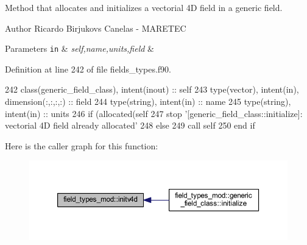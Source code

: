 Method that allocates and initializes a vectorial 4D field in a generic field. 

\begin{DoxyAuthor}{Author}
Ricardo Birjukovs Canelas -\/ M\+A\+R\+E\+T\+EC 
\end{DoxyAuthor}

\begin{DoxyParams}[1]{Parameters}
\mbox{\tt in}  & {\em self,name,units,field} & \\
\hline
\end{DoxyParams}


Definition at line 242 of file fields\+\_\+types.\+f90.


\begin{DoxyCode}
242     \textcolor{keywordtype}{class}(generic\_field\_class), \textcolor{keywordtype}{intent(inout)} :: self
243     \textcolor{keywordtype}{type}(vector), \textcolor{keywordtype}{intent(in)}, \textcolor{keywordtype}{dimension(:,:,:,:)} :: field
244     \textcolor{keywordtype}{type}(string), \textcolor{keywordtype}{intent(in)} :: name
245     \textcolor{keywordtype}{type}(string), \textcolor{keywordtype}{intent(in)} :: units
246     \textcolor{keywordflow}{if} (\textcolor{keyword}{allocated}(self%
247         stop \textcolor{stringliteral}{'[generic\_field\_class::initialize]: vectorial 4D field already allocated'}
248     \textcolor{keywordflow}{else}
249         \textcolor{keyword}{call }self%
250 \textcolor{keywordflow}{    end if}
\end{DoxyCode}
Here is the caller graph for this function\+:
\nopagebreak
\begin{figure}[H]
\begin{center}
\leavevmode
\includegraphics[width=350pt]{namespacefield__types__mod_a6a387f83b9c3e63a795e3bccfff5573b_icgraph}
\end{center}
\end{figure}
\mbox{\label{namespacefield__types__mod_a31c78f82114b5bf8014f7aac09030c32}} 
